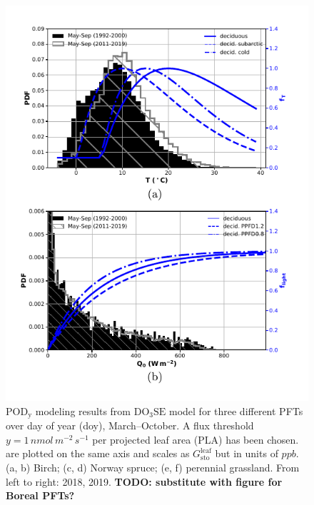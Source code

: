 \documentclass[bg, manuscript]{copernicus}
\begin{document}
\begin{figure}[t]
  \includegraphics[width=12cm]{figB4}
  \caption{$\mathrm{POD_y}$ modeling results from $\mathrm{DO_3SE}$ model for three different PFTs over day of year (doy), March--October. A flux threshold $y=1\,\unit{nmol\,m^{-2}\,s^{-1}}$ per projected leaf area (PLA) has been chosen. \chem{[O_3]} are plotted on the same axis and scales as $G_\text{sto}^\text{leaf}$ but in units of $\unit{ppb}$. (a, b) Birch; (c, d) Norway spruce; (e, f) perennial grassland. From left to right: 2018, 2019. {\bf TODO: substitute with figure for Boreal PFTs?}}
  \label{fig:pody}
\end{figure}


\noappendix       %


\end{document}
